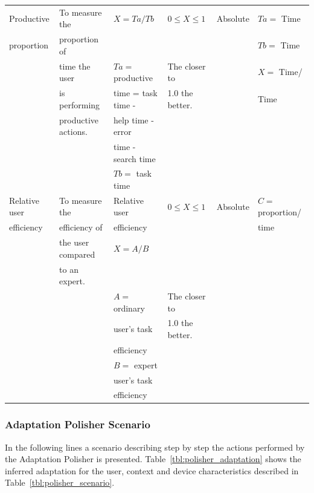 \begin{table}
\begin{tabular}{l l l l l l}
\hline
Productive	& To measure the  	& $X=Ta/Tb$			& $0\leq X \leq 1$  		& Absolute 		& $Ta=$ Time 		\\
proportion 	& proportion of 	& 				& 				& 			& $Tb=$ Time		\\
		& time the user 	& $Ta=$ productive 		& The closer to 		& 			& $X=$ Time/		\\
		& is performing		& time = task time - 		& 1.0 the better.		& 			& Time			\\  
		& productive actions.	& help time - error 		& 				& 			& 			\\
		& 			& time - search time \\
		& 			& $Tb=$ task time \\
\hline
Relative user  	& To measure the  	& Relative user			& $0\leq X \leq 1$  		& Absolute 		& $C=$ proportion/ 	\\
efficiency 	& efficiency of 	& efficiency			& 				& 			& time			\\
		& the user compared 	& $X=A/B$			&				& 			&~			\\
		& to an expert.		& 				& 				& 			& 			\\
		& 			& $A=$ ordinary 		& The closer to			& 			&~			\\  
		&			& user's task 			& 1.0 the better.		& 			& 			\\
		&			& efficiency 	\\
		& 			& $B=$ expert 			& 				& 			& 			\\
		& 			& user's task 			& 				& 			& 			\\
		& 			& efficiency	\\
\hline

\end{tabular}
\end{table}



\subsubsection{Adaptation Polisher Scenario}
\label{sec:adaptation_polisher_scenario}

In the following lines a scenario describing step by step the actions performed
by the Adaptation Polisher is presented. Table~\ref{tbl:polisher_adaptation} 
shows the inferred adaptation for the user, context and device characteristics 
described in Table~\ref{tbl:polisher_scenario}.

